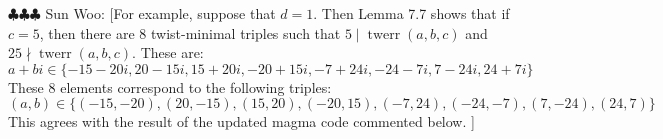\documentclass[12pt]{amsart}
\numberwithin{equation}{section} %
\theoremstyle{definition} \newtheorem{definition}[counter]{Definition}
\theoremstyle{remark} \newtheorem{nonexam}[counter]{Non-example}
\newcommand{\spark}[1]{{\color{olive} \sf
    $\clubsuit\clubsuit\clubsuit$ Sun Woo: [#1]}}
\DeclareMathOperator{\twerr}{twerr} %
\begin{document}
\spark{For example, suppose that $d=1$. Then Lemma 7.7 shows that if $c = 5$,
  then there are $8$ twist-minimal triples such that $5 \mid \twerr(a,b,c)$ and
  $25 \nmid \twerr(a,b,c)$. These are:
\begin{equation*}
    a+bi \in \{-15-20i, 20-15i, 15 + 20i, -20+15i, -7 + 24i, -24-7i, 7 - 24i, 24 + 7i\}
\end{equation*}
These 8 elements correspond to the following triples:
\begin{equation*}
    (a,b) \in \{(-15,-20),(20,-15),(15,20),(-20,15),(-7,24),(-24,-7),(7,-24),(24,7)\}
\end{equation*}
This agrees with the result of the updated magma code commented below.
}


\end{document}
